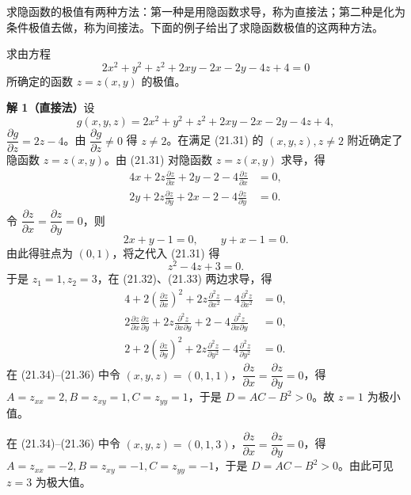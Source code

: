 求隐函数的极值有两种方法：第一种是用隐函数求导，称为直接法；第二种是化为条件极值去做，称为间接法。下面的例子给出了求隐函数极值的这两种方法。

\begin{xexample}[21.4.5]
求由方程
\begin{equation}
  2x^2+y^2+z^2+2xy-2x-2y-4z+4=0
  \tag{21.31}
  \label{eq:21.31}
\end{equation}
所确定的函数 $z=z(x,y)$ 的极值。
\end{xexample}
\begin{xsolution}
\textbf{解 1（直接法）}\quad 设
\[
  g(x,y,z)=2x^2+y^2+z^2+2xy-2x-2y-4z+4,
\]
$\dfrac{\partial g}{\partial z}=2z-4$。由 $\dfrac{\partial g}{\partial z}\ne0$ 得 $z\ne2$。在满足 (21.31) 的 $(x,y,z),z\ne2$ 附近确定了隐函数 $z=z(x,y)$。由 (21.31) 对隐函数 $z=z(x,y)$ 求导，得
\begin{align}
  4x+2z\frac{\partial z}{\partial x}+2y-2-4\frac{\partial z}{\partial x}&=0, \tag{21.32}\label{eq:21.32}\\
  2y+2z\frac{\partial z}{\partial y}+2x-2-4\frac{\partial z}{\partial y}&=0. \tag{21.33}\label{eq:21.33}
\end{align}
令 $\dfrac{\partial z}{\partial x}=\dfrac{\partial z}{\partial y}=0$，则
\[
  2x+y-1=0,\qquad y+x-1=0.
\]
由此得驻点为 $(0,1)$，将之代入 (21.31) 得
\[
  z^2-4z+3=0.
\]
于是 $z_1=1,z_2=3$，在 (21.32)、(21.33) 两边求导，得
\begin{align}
  4+2\left(\frac{\partial z}{\partial x}\right)^2+2z\frac{\partial^2z}{\partial x^2}-4\frac{\partial^2z}{\partial x^2}&=0, \tag{21.34}\label{eq:21.34}\\
  2\frac{\partial z}{\partial x}\frac{\partial z}{\partial y}+2z\frac{\partial^2z}{\partial x\partial y}+2-4\frac{\partial^2z}{\partial x\partial y}&=0, \tag{21.35}\label{eq:21.35}\\
  2+2\left(\frac{\partial z}{\partial y}\right)^2+2z\frac{\partial^2z}{\partial y^2}-4\frac{\partial^2z}{\partial y^2}&=0. \tag{21.36}\label{eq:21.36}
\end{align}
在 (21.34)--(21.36) 中令 $(x,y,z)=(0,1,1)$，$\dfrac{\partial z}{\partial x}=\dfrac{\partial z}{\partial y}=0$，得 $A=z_{xx}=2,B=z_{xy}=1,C=z_{yy}=1$，于是 $D=AC-B^2>0$。故 $z=1$ 为极小值。

在 (21.34)--(21.36) 中令 $(x,y,z)=(0,1,3)$，$\dfrac{\partial z}{\partial x}=\dfrac{\partial z}{\partial y}=0$，得 $A=z_{xx}=-2,B=z_{xy}=-1,C=z_{yy}=-1$，于是 $D=AC-B^2>0$。由此可见 $z=3$ 为极大值。


\end{xsolution}
